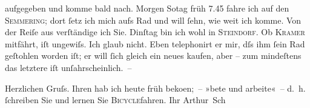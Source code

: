                aufgegeben und komme bald nach. Morgen So{\geminationn}tag{ }früh 7.45 fahre ich auf den \textsc{Semmering}; dort{ }ſetz ich mich aufs Rad und will{ }ſehn, wie weit ich komme. Von der {\pb}Reiſe aus verſtändige ich Sie. Dinſtag
               bin ich wohl in \textsc{Steindorf}. Ob \textsc{Kramer} mitfährt, iſt ungewiſs. Ich glaub nicht. Eben telephonirt er mir, dſs ihm{ }ſein
               Rad geſtohlen worden iſt; er will{ }ſich gleich ein neues kaufen, aber – zum mindeſtens
               das letztere {\pb}iſt unſahrscheinlich. –\pend
           
\pstart
           Herzlichen Gruſs. Ihren \label{K_L00801-1v}\label{K_L00801-1} hab ich heute früh beko{\geminationm}en; – »bete und arbeite« – d. h.{ }ſchreiben Sie und lernen Sie \textsc{Bicycle}fahren.\pend
           \pstart Ihr \spacefill\mbox{Arthur Sch}\pend{}\endnumbering{}  \newcommand{\dateiname}{L00801}\newcommand{\titel}{Arthur Schnitzler an Richard Beer-Hofmann, 4. 6. 1898}\newcommand{\editorInnen}{Martin Anton Müller und Gerd-Hermann Susen}
